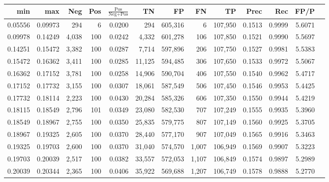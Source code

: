 \begin{tabular}{rrrrrrrrrrrrr}
\toprule
    min &     max &   Neg & Pos & $\frac{\text{Pos}}{\text{Neg}+\text{Pos}}$ &      TN &      FP &      FN &      TP &   Prec &    Rec &   FP/P \\
\midrule
0.05556 & 0.09973 &   294 &   6 &                                     0.0200 &     294 & 605,316 &       6 & 107,950 & 0.1513 & 0.9999 & 5.6071 \\
0.09978 & 0.14249 & 4,038 & 100 &                                     0.0242 &   4,332 & 601,278 &     106 & 107,850 & 0.1521 & 0.9990 & 5.5697 \\
0.14251 & 0.15472 & 3,382 & 100 &                                     0.0287 &   7,714 & 597,896 &     206 & 107,750 & 0.1527 & 0.9981 & 5.5383 \\
0.15472 & 0.16362 & 3,411 & 100 &                                     0.0285 &  11,125 & 594,485 &     306 & 107,650 & 0.1533 & 0.9972 & 5.5067 \\
0.16362 & 0.17152 & 3,781 & 100 &                                     0.0258 &  14,906 & 590,704 &     406 & 107,550 & 0.1540 & 0.9962 & 5.4717 \\
0.17152 & 0.17732 & 3,155 & 100 &                                     0.0307 &  18,061 & 587,549 &     506 & 107,450 & 0.1546 & 0.9953 & 5.4425 \\
0.17732 & 0.18114 & 2,223 & 100 &                                     0.0430 &  20,284 & 585,326 &     606 & 107,350 & 0.1550 & 0.9944 & 5.4219 \\
0.18115 & 0.18549 & 2,796 & 101 &                                     0.0349 &  23,080 & 582,530 &     707 & 107,249 & 0.1555 & 0.9935 & 5.3960 \\
0.18549 & 0.18967 & 2,755 & 100 &                                     0.0350 &  25,835 & 579,775 &     807 & 107,149 & 0.1560 & 0.9925 & 5.3705 \\
0.18967 & 0.19325 & 2,605 & 100 &                                     0.0370 &  28,440 & 577,170 &     907 & 107,049 & 0.1565 & 0.9916 & 5.3463 \\
0.19325 & 0.19703 & 2,600 & 100 &                                     0.0370 &  31,040 & 574,570 &   1,007 & 106,949 & 0.1569 & 0.9907 & 5.3223 \\
0.19703 & 0.20039 & 2,517 & 100 &                                     0.0382 &  33,557 & 572,053 &   1,107 & 106,849 & 0.1574 & 0.9897 & 5.2989 \\
0.20039 & 0.20344 & 2,365 & 100 &                                     0.0406 &  35,922 & 569,688 &   1,207 & 106,749 & 0.1578 & 0.9888 & 5.2770 \\

\end{tabular}

